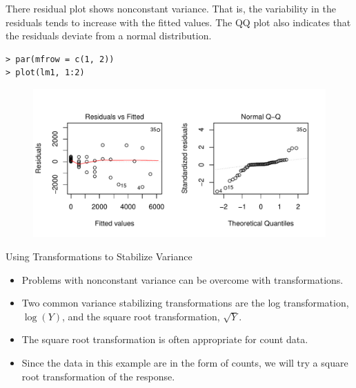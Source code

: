 \documentclass[10pt]{beamer}
\begin{document}
\begin{frame}[fragile]
There residual plot shows nonconstant variance.  That is, the variability in the residuals tends to increase with the fitted values.  The QQ plot also indicates that the residuals deviate from a normal distribution.
\small
\begin{verbatim}
> par(mfrow = c(1, 2))
> plot(lm1, 1:2)
\end{verbatim}
\begin{figure}
\includegraphics[scale=0.55]{figure/diagnostic1.pdf}
\end{figure}
\end{frame}

\begin{frame}{Using Transformations to Stabilize Variance}
\begin{itemize}
\item Problems with nonconstant variance can be overcome with transformations.
\vspace{5pt}
\item Two common variance stabilizing transformations are the log transformation, $\log(Y)$, and the square root transformation, $\sqrt{Y}$.  
\vspace{5pt}
\item The square root transformation is often appropriate for count data.
\vspace{5pt}
\item Since the data in this example are in the form of counts, we will try a square root transformation of the response.  
\end{itemize}
\end{frame}
\end{document}
